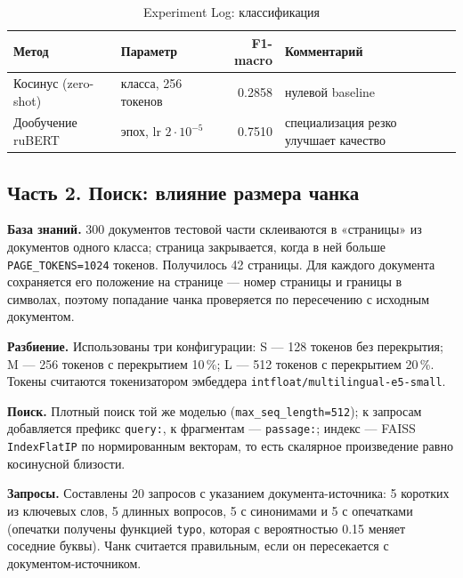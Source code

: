 \documentclass[14pt,a4paper]{extarticle}
\begin{document}
\begin{table}[H]
    \centering
    \caption*{\raggedleft Experiment Log: классификация}
    \label{tab:log1}
    \small
    \begin{tabularx}{\textwidth}{>{\raggedright\arraybackslash}p{}%
                    >{\raggedright\arraybackslash}X r
                    >{\raggedright\arraybackslash}X}
        \toprule
        Метод & Параметр & F1-macro & Комментарий \\
        \midrule
        Косинус (zero-shot) & 4 класса, 256 токенов & 0.2858 & нулевой baseline \\
        Дообучение ruBERT & 5 эпох, lr $2\cdot10^{-5}$ & 0.7510 &
        специализация резко улучшает качество \\
        \bottomrule
    \end{tabularx}
\end{table}

\subsection{Часть 2. Поиск: влияние размера чанка}

\textbf{База знаний.} 300 документов тестовой части склеиваются в «страницы»
из документов одного класса; страница закрывается, когда в ней больше
\texttt{PAGE\_TOKENS=1024} токенов. Получилось 42 страницы. Для каждого документа
сохраняется его положение на странице --- номер страницы и границы в символах,
поэтому попадание чанка проверяется по пересечению с исходным документом.

\textbf{Разбиение.} Использованы три конфигурации: S --- 128 токенов без
перекрытия; M --- 256 токенов с перекрытием 10\,\%; L --- 512 токенов
с перекрытием 20\,\%. Токены считаются токенизатором эмбеддера
\texttt{intfloat/multilingual-e5-small}.

\textbf{Поиск.} Плотный поиск той же моделью (\texttt{max\_seq\_length=512});
к запросам добавляется префикс \texttt{query:}, к фрагментам ---
\texttt{passage:}; индекс --- FAISS \texttt{IndexFlatIP} по нормированным
векторам, то есть скалярное произведение равно косинусной близости.

\textbf{Запросы.} Составлены 20 запросов с указанием документа-источника:
5 коротких из ключевых слов, 5 длинных вопросов, 5 с синонимами и 5 с опечатками
(опечатки получены функцией \texttt{typo}, которая с вероятностью 0.15 меняет
соседние буквы). Чанк считается правильным, если он пересекается с документом-источником.
\end{document}

